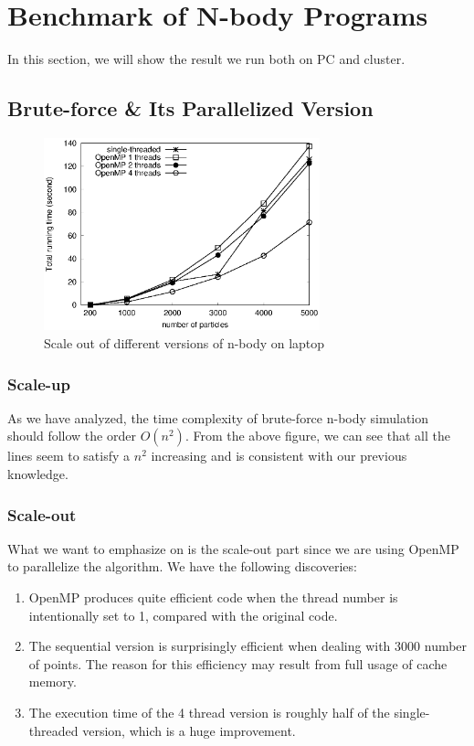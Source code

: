 \documentclass{article}
\begin{document}
\section{Benchmark of N-body Programs}
In this section, we will show the result we run both on PC and cluster.
\subsection{Brute-force \& Its Parallelized Version}
\begin{figure}[H]
\centering
	\includegraphics[width=8cm]{fig/scale_out.eps}
	\caption{Scale out of different versions of n-body on laptop}
\end{figure}

\subsubsection{Scale-up}
As we have analyzed, the time complexity of brute-force n-body simulation
should follow the order $O(n^2)$. From the above figure, we can see that
all the lines seem to satisfy a $n^2$ increasing and is consistent with
our previous knowledge.

\subsubsection{Scale-out}
What we want to emphasize on is the scale-out part since we are using
OpenMP to parallelize the algorithm. We have the following discoveries:
\begin{enumerate}
\item OpenMP produces quite efficient code when the thread number is intentionally set to 1, compared with the original code.
\item The sequential version is surprisingly efficient when dealing with $3000$ number of points. The reason for this efficiency may result from full usage of cache memory.
\item The execution time of the 4 thread version is roughly half of the single-threaded version, which is a huge improvement.
\end{enumerate}
\end{document}
